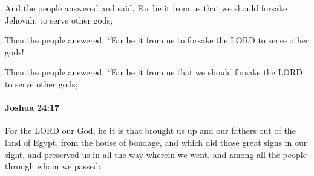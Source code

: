			\begin{versebox}
					\item[BHS] 
					\item[ASV] And the people answered and said, Far be it from us that we should forsake Jehovah, to serve other gods;
					\item[NIV] Then the people answered, “Far be it from us to forsake the LORD to serve other gods!
					\item[NRSV] Then the people answered, “Far be it from us that we should forsake the LORD to serve other gods;
			\end{versebox}

		\paragraph{Joshua 24:17} %
			\label{JOSHUA-24-17}

			For the LORD our God, he it is that brought us up and our fathers out of the land of Egypt, from the house of bondage, and which did those great signs in our sight, and preserved us in all the way wherein we went, and among all the people through whom we passed:

